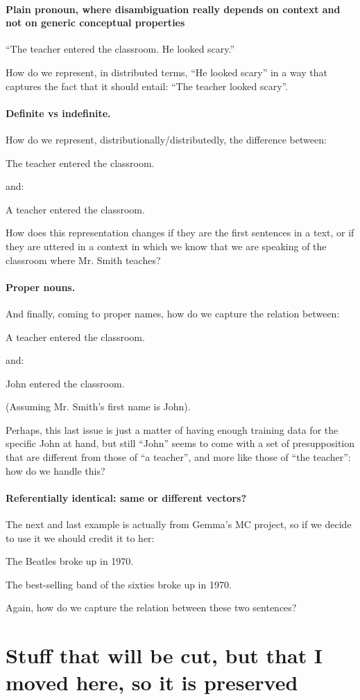 \documentclass[a4paper,12pt]{article}
\begin{document}
\paragraph{Plain
pronoun, where
disambiguation really depends on context and not on generic
conceptual
properties}

``The teacher entered the classroom.
He looked scary.''

How do we represent, in distributed terms, ``He looked
scary'' in a way that
captures the fact that it should entail: ``The teacher
looked scary''.

\paragraph{Definite vs indefinite.}

How do we represent, distributionally/distributedly, the
difference between:

The teacher entered the classroom.

and:

A teacher entered the classroom.

How does this representation changes if they are the first
sentences in a
text, or if they are uttered in a context in which we know
that we are
speaking of the classroom where Mr. Smith teaches?

\paragraph{Proper nouns.}

And finally, coming to proper names, how do we capture the
relation between:

A teacher entered the classroom.

and:

John entered the classroom.

(Assuming Mr. Smith's first name is John).

Perhaps, this last issue is just a matter of having enough
training data
for the specific John at hand, but still ``John'' seems to
come with a set of
presupposition that are different from those of ``a
teacher'', and more like
those of ``the teacher'': how do we handle this?

\paragraph{Referentially identical: same or different
  vectors?}
The next and last example is actually from Gemma's MC
project, so if we
decide to use it we should credit it to her:

The Beatles broke up in 1970.

The best-selling band of the sixties broke up in 1970.

Again, how do we capture the relation between these two
sentences?


\section{Stuff that will be cut, but that I moved here, so
  it is preserved}



\end{document}
